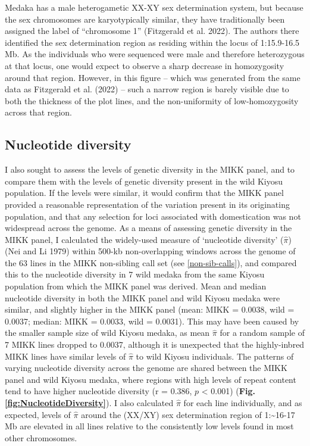\documentclass[
]{book}
\begin{document}
Medaka has a male heterogametic XX-XY sex determination system, but because the sex chromosomes are karyotypically similar, they have traditionally been assigned the label of ``chromosome 1'' (Fitzgerald et al. 2022). The authors there identified the sex determination region as residing within the locus of 1:15.9-16.5 Mb. As the individuals who were sequenced were male and therefore heterozygous at that locus, one would expect to observe a sharp decrease in homozygosity around that region. However, in this figure -- which was generated from the same data as Fitzgerald et al. (2022) -- such a narrow region is barely visible due to both the thickness of the plot lines, and the non-uniformity of low-homozygosity across that region.

\hypertarget{nuc-div}{%
\subsection{Nucleotide diversity}\label{nuc-div}}

I also sought to assess the levels of genetic diversity in the MIKK panel, and to compare them with the levels of genetic diversity present in the wild Kiyosu population. If the levels were similar, it would confirm that the MIKK panel provided a reasonable representation of the variation present in its originating population, and that any selection for loci associated with domestication was not widespread across the genome. As a means of assessing genetic diversity in the MIKK panel, I calculated the widely-used measure of `nucleotide diversity' (\(\hat{\pi}\)) (Nei and Li 1979) within 500-kb non-overlapping windows across the genome of the 63 lines in the MIKK non-sibling call set (see \ref{non-sib-calls}), and compared this to the nucleotide diversity in 7 wild medaka from the same Kiyosu population from which the MIKK panel was derived. Mean and median nucleotide diversity in both the MIKK panel and wild Kiyosu medaka were similar, and slightly higher in the MIKK panel (mean: MIKK = 0.0038, wild = 0.0037; median: MIKK = 0.0033, wild = 0.0031). This may have been caused by the smaller sample size of wild Kiyosu medaka, as mean \(\hat{\pi}\) for a random sample of 7 MIKK lines dropped to 0.0037, although it is unexpected that the highly-inbred MIKK lines have similar levels of \(\hat{\pi}\) to wild Kiyosu individuals. The patterns of varying nucleotide diversity across the genome are shared between the MIKK panel and wild Kiyosu medaka, where regions with high levels of repeat content tend to have higher nucleotide diversity (r = 0.386, \(p\) \textless{} 0.001) (\textbf{Fig. \ref{fig:NucleotideDiversity}}). I also calculated \(\hat{\pi}\) for each line individually, and as expected, levels of \(\hat{\pi}\) around the (XX/XY) sex determination region of 1:\textasciitilde16-17 Mb are elevated in all lines relative to the consistently low levels found in most other chromosomes.
\end{document}
